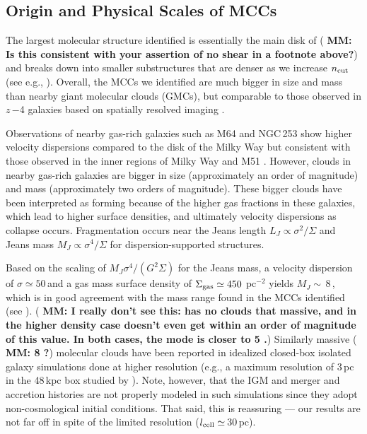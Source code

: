 \IfFileExists{emulateapjlegacy.cls}{\documentclass[iop]{emulateapjlegacy}}{\documentclass[iop]{emulateapj}}
\newcommand{\MM}[1]{({\bf \color{mmcolor} MM: #1})}
\begin{document}
\subsection{Origin and Physical Scales of MCCs} \label{sec:origin}

The largest molecular structure identified is essentially the main
disk of \flower \MM{Is this consistent with your assertion of no shear
  in a footnote above?} and breaks down into smaller substructures that are
denser as we increase $n_{\rm cut}$ (see e.g.,
). Overall, the MCCs we identified are much bigger in
size and mass than nearby giant molecular clouds (GMCs), but comparable to those observed in $z$\,$-$4 galaxies based on spatially resolved imaging \citep{Swinbank11a}.

Observations of nearby gas-rich galaxies such as M64 and NGC\,253 show
higher velocity dispersions compared to the disk
of the Milky Way but consistent with those observed in the inner regions of Milky Way and M51 \citep{Oka01a, Rosolowsky05a, Heyer09a, Hughes13b, Leroy15a, Rice16a}.  %
However, clouds in nearby gas-rich galaxies are bigger in size (approximately an order of magnitude) and mass (approximately two orders of magnitude).
These bigger clouds have been interpreted as 
    forming because of the higher gas fractions in these galaxies,
    which lead to higher
surface densities, and 
   ultimately velocity dispersions as collapse occurs.
Fragmentation occurs near the Jeans length $L_J\propto\sigma^2/\Sigma$ and
Jeans mass $M_J\propto\sigma^4/\Sigma$ for dispersion-supported structures.

Based on the scaling of $M_J$\eq$\sigma^4/(G^2\Sigma)$ for the Jeans mass, a
velocity dispersion of $\sigma\simeq50$\,\kms and a
gas mass surface density of $\Sigma_{\rm gas}\simeq450$\,\Msun\,pc$^{-2}$ yields
$M_J\sim$\,8\,\Msun, which is in good agreement with the mass
range found in the MCCs identified (see ).  \MM{I really
  don't see this: \Fig{dist} has no clouds that massive, and in
  the higher density case doesn't even get within an order of
  magnitude of this value.  In both cases, the mode is closer to 5\E{6} \Msun.}
%
Similarly massive \MM{8 \Msun?} molecular clouds have been reported in idealized closed-box isolated galaxy simulations done at higher resolution (e.g., a maximum
resolution of 3\,pc in the 48\,kpc box studied by \citealt{Behrendt16a}).
Note, however, that the IGM and merger and accretion histories are not properly modeled in such simulations since they adopt non-cosmological initial conditions. That said, this is reassuring --- our results are not far off in spite of the limited resolution ($l_{\rm cell}\simeq$\,30\,pc).
\end{document}
